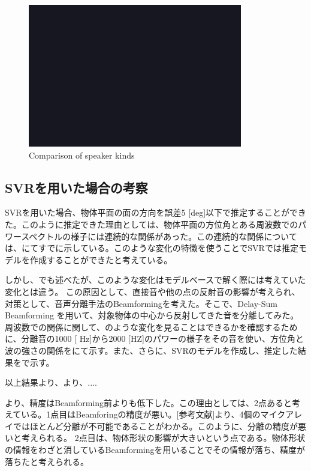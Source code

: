 \begin{figure}[ht]
  \begin{center}
  \vspace{1zh}
    \includegraphics[width=0.5\linewidth]{images/fig_sample.png}   
  \end{center}
  \caption{Comparison of speaker kinds}
  \label{fig:result_speaker_kinds}
\end{figure}

\clearpage

\subsection{SVRを用いた場合の考察}
SVRを用いた場合、物体平面の面の方向を誤差5 [deg]以下で推定することができた。このように推定できた理由としては、物体平面の方位角とある周波数でのパワースペクトルの様子には連続的な関係があった。この連続的な関係については、にてすでに示している。このような変化の特徴を使うことでSVRでは推定モデルを作成することができたと考えている。

しかし、でも述べたが、このような変化はモデルベースで解く際には考えていた変化とは違う。
この原因として、直接音や他の点の反射音の影響が考えられ、対策として、音声分離手法のBeamformingを考えた。そこで、Delay-Sum Beamforming を用いて、対象物体の中心から反射してきた音を分離してみた。周波数での関係に関して、のような変化を見ることはできるかを確認するために、分離音の1000 [ Hz]から2000 [HZ]のパワーの様子をその音を使い、方位角と波の強さの関係をにて示す。また、さらに、SVRのモデルを作成し、推定した結果をで示す。

以上結果より、より、.... 

より、精度はBeamforming前よりも低下した。この理由としては、2点あると考えている。1点目はBeamforingの精度が悪い。[参考文献]より、4個のマイクアレイではほとんど分離が不可能であることがわかる。このように、分離の精度が悪いと考えられる。
2点目は、物体形状の影響が大きいという点である。物体形状の情報をわざと消しているBeamformingを用いることでその情報が落ち、精度が落ちたと考えられる。

